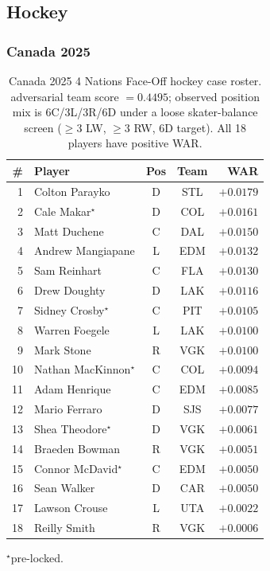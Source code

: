 \documentclass[11pt,letterpaper]{article}
\begin{document}
\subsection{Hockey}

\subsubsection{Canada 2025}

\begin{table}[htbp]
  \centering
  \small
  \caption{Canada 2025 4 Nations Face-Off hockey case roster.
    adversarial team score $= 0.4495$; observed position mix is
    6C/3L/3R/6D under a loose skater-balance screen ($\geq 3$ LW,
    $\geq 3$ RW, 6D target). All 18 players have positive WAR.}
  \begin{tabular}{r l c c r}
    \toprule
    \# & Player & Pos & Team & WAR \\
    \midrule
    1  & Colton Parayko     & D & STL & $+0.0179$ \\
    2  & Cale Makar$^{\star}$          & D & COL & $+0.0161$ \\
    3  & Matt Duchene       & C & DAL & $+0.0150$ \\
    4  & Andrew Mangiapane  & L & EDM & $+0.0132$ \\
    5  & Sam Reinhart       & C & FLA & $+0.0130$ \\
    6  & Drew Doughty       & D & LAK & $+0.0116$ \\
    7  & Sidney Crosby$^{\star}$       & C & PIT & $+0.0105$ \\
    8  & Warren Foegele     & L & LAK & $+0.0100$ \\
    9  & Mark Stone         & R & VGK & $+0.0100$ \\
    10 & Nathan MacKinnon$^{\star}$    & C & COL & $+0.0094$ \\
    11 & Adam Henrique      & C & EDM & $+0.0085$ \\
    12 & Mario Ferraro      & D & SJS & $+0.0077$ \\
    13 & Shea Theodore$^{\star}$       & D & VGK & $+0.0061$ \\
    14 & Braeden Bowman     & R & VGK & $+0.0051$ \\
    15 & Connor McDavid$^{\star}$      & C & EDM & $+0.0050$ \\
    16 & Sean Walker        & D & CAR & $+0.0050$ \\
    17 & Lawson Crouse      & L & UTA & $+0.0022$ \\
    18 & Reilly Smith       & R & VGK & $+0.0006$ \\
    \bottomrule
  \end{tabular}
  \par \footnotesize{$^{\star}$pre-locked.}
\end{table}
\end{document}
